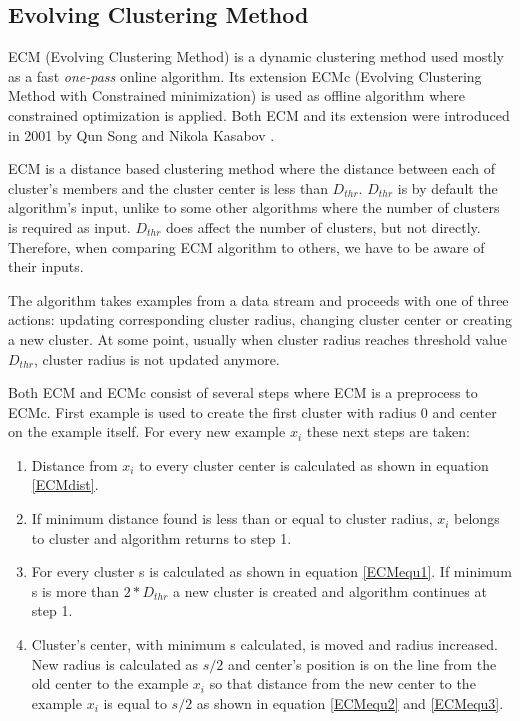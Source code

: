 \documentclass[conference]{IEEEtran}
\begin{document}
\subsection{Evolving Clustering Method}

ECM (Evolving Clustering Method) is a dynamic clustering method used mostly as a fast \textit{one-pass} online algorithm. %
Its extension ECMc (Evolving Clustering Method with Constrained minimization) is used as offline algorithm where constrained optimization
is applied. Both ECM and its extension were introduced in 2001 by Qun Song and Nikola Kasabov \cite{song01}.

ECM is a distance based clustering method where the distance between each of cluster's members and the cluster center is less than $D_{thr}$.%
$D_{thr}$ is by default the algorithm's input, unlike to some other algorithms where the number of clusters is required as
input. $D_{thr}$ does affect the number of clusters, but not directly. Therefore, when comparing ECM algorithm to
others, we have to be aware of their inputs.

The algorithm takes examples from a data stream and proceeds with one of three actions: updating corresponding cluster radius, changing
cluster center or creating a new cluster.
At some point, usually when cluster radius reaches threshold value $D_{thr}$, cluster radius
is not updated anymore.

Both ECM and ECMc consist of several steps where ECM is a preprocess to ECMc. First example is used to create the first cluster
with radius 0 and center on the example itself. For every new example $x_i$ these next steps are taken:
\begin{enumerate}
	\item Distance from $x_i$ to every cluster center is calculated as shown in equation \ref{ECMdist}.
	\item If minimum distance found is less than or equal to cluster radius, $x_i$ belongs to cluster and algorithm returns to step 1.
	\item For every cluster s is calculated as shown in equation \ref{ECMequ1}. If minimum s is more than $2*D_{thr}$ a new cluster
		is created and algorithm continues at step 1.
	\item Cluster's center, with minimum s calculated, is moved and radius increased. New radius is calculated as $s/2$ and
		center's position is on the line from the old center to the example $x_i$ so that distance from the new center to the example $x_i$ is
		equal to $s/2$ as shown in equation \ref{ECMequ2} and \ref{ECMequ3}.
\end{enumerate}
\end{document}
